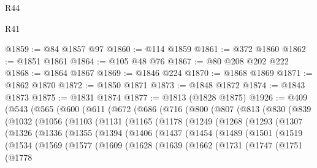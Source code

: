 \begin{lexlean}{R44}
\begin{lexlean}{R41}
\begin{coremodule}
{{{{{{{{{{{{{{{{{{{{{{{{{{{{{{{{{{{{{{{{{{{{{{{{{{{{{{{{{{{{{{{{{{{{{{{{{{{{{{{{{{{{{{{@1859 := @84 @1857 @97
@1860 := @114 @1859
@1861 := @372 @1860
@1862 := @1851 @1861
@1864 := @105 @48 @76
@1867 := @80 @208 @202 @222
@1868 := @1864 @1867
@1869 := @1846 @224
@1870 := @1868 @1869
@1871 := @1862 @1870
@1872 := @1850 @1871
@1873 := @1848 @1872
@1874 := @1843 @1873
@1875 := @1831 @1874
@1877 := @1813 (@1828 @1875)
@1926 := @409
    (@543
      (@565
        (@600
          (@611
            (@672
              (@686
                (@716
                  (@800
                    (@807
                      (@813
                        (@830
                          (@839
                            (@1032
                              (@1056
                                (@1103
                                  (@1131
                                    (@1165
                                      (@1178
                                        (@1249
                                          (@1268
                                            (@1293
                                              (@1307
                                                (@1326
                                                  (@1336
                                                    (@1355
                                                      (@1394
                                                        (@1406
                                                          (@1437
                                                            (@1454
                                                              (@1489
                                                                (@1501
                                                                  (@1519
                                                                    (@1534
                                                                      (@1569
                                                                        (@1577
                                                                          (@1609
                                                                            (@1628
                                                                              (@1639
                                                                                (@1662
                                                                                  (@1731
                                                                                    (@1747
                                                                                      (@1751
                                                                                        (@1778
}}}}}}}}}}}}}}}}}}}}}}}}}}}}}}}}}}}}}}}}}}}}}}}}}}}}}}}}}}}}}}}}}}}}}}}}}}}}}}}}}}}}}}}
\end{coremodule}
\end{lexlean}
\end{lexlean}
